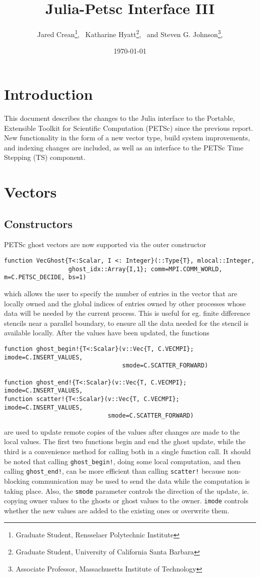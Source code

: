 \documentclass{article}
\title{Julia-Petsc Interface III}
\author{
  Jared Crean\thanks{Graduate Student, Rensselaer Polytechnic Institute}, \
  Katharine Hyatt\thanks{Graduate Student, University of California Santa Barbara}, \ and
  Steven G. Johnson\thanks{Associate Professor, Massachusetts Institute of Technology},
}
\date{\today}
\newcommand{\ttt}{\texttt}
\begin{document}
\maketitle

\section{Introduction} \label{sec:intro}
This document describes the changes to the Julia interface to the Portable, Extensible Toolkit for Scientific Computation (PETSc) since the previous report.
New functionality in the form of a new vector type, build system improvements, and indexing changes are included, as well as an interface to the PETSc Time Stepping (TS)
component.


\section{Vectors}
\subsection{Constructors}
PETSc ghost vectors are now supported via the outer constructor

\begin{verbatim}
function VecGhost{T<:Scalar, I <: Integer}(::Type{T}, mlocal::Integer, 
                  ghost_idx::Array{I,1}; comm=MPI.COMM_WORLD, m=C.PETSC_DECIDE, bs=1)
\end{verbatim}
\noindent which allows the user to specify the number of entries in the vector 
that are locally owned and the global indices of entries owned by other 
processes whose data will be needed by the current process.  This is useful
for eg. finite difference stencils near a parallel boundary, to ensure all the 
data needed for the stencil is available locally. After the values have been
updated, the functions

\begin{verbatim}
function ghost_begin!{T<:Scalar}(v::Vec{T, C.VECMPI}; imode=C.INSERT_VALUES,
                                 smode=C.SCATTER_FORWARD)

function ghost_end!{T<:Scalar}(v::Vec{T, C.VECMPI}; imode=C.INSERT_VALUES,
function scatter!{T<:Scalar}(v::Vec{T, C.VECMPI}; imode=C.INSERT_VALUES, 
                             smode=C.SCATTER_FORWARD)
\end{verbatim}

\noindent are used to update remote copies of the values after changes are made
to the local values.  The first two functions begin and end the ghost update, 
while the third is a convenience method for calling both in a single function 
call.  It should be noted that calling \texttt{ghost\_begin!}, doing some 
local computation, and then calling \texttt{ghost\_end!}, can be more efficient
than calling \ttt{scatter!} because non-blocking communication may be used to
send the data while the computation is taking place.  
Also, the \texttt{smode} parameter controls the direction of
the update, ie. copying owner values to the ghosts or ghost values to the owner.
\texttt{imode} controls whether the new values are added to the existing 
ones or overwrite them.
\end{document}
